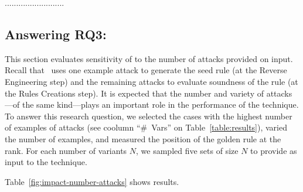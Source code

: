 \documentclass[sigconf,review, anonymous]{acmart}
\begin{document}
\begin{center}
\begin{tcolorbox}[enhanced,width=3.3in,center upper,drop shadow southwest,sharp corners]
..........................
\end{tcolorbox}
\end{center}

\subsection{Answering RQ3: \textRQthree}
\label{sec:answer-rqthree}

This section evaluates sensitivity of \tname{} to the number of
attacks provided on input. Recall that \tname\ uses one example attack
to generate the seed rule (at the Reverse Engineering step) and the
remaining attacks to evaluate soundness of the rule (at the Rules
Creations step). It is expected that the number and variety of
attacks---of the same kind---plays an important role in the
performance of the technique. To answer this research question, we
selected the cases with the highest number of examples of attacks (see
coolumn ``\#~Vars'' on Table~\ref{table:results}), varied the number of
examples, and measured the position of the golden rule at the
rank. For each number of variants $N$, we sampled five sets of size
$N$ to provide as input to the technique.

Table~\ref{fig:impact-number-attacks} shows
results. 
\end{document}
